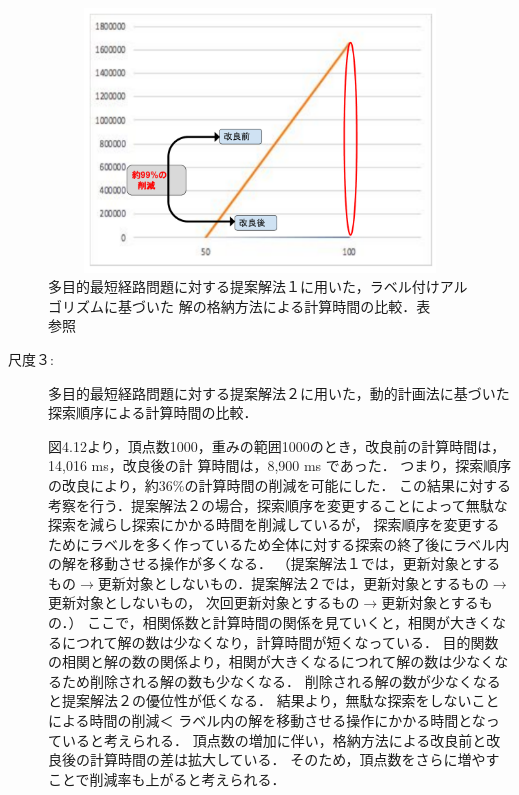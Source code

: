 \documentclass[12pt]{optlab-bachelor}
\begin{document}
\begin{figure}[htbp]
  \centering
  \includegraphics[height=7.0cm , width=15.0cm]{fig/fig14.pdf}
  \caption{多目的最短経路問題に対する提案解法１に用いた，ラベル付けアルゴリズムに基づいた
  解の格納方法による計算時間の比較．表　　参照}
\end{figure}


\begin{description}
  \item[尺度３:]
  多目的最短経路問題に対する提案解法２に用いた，動的計画法に基づいた探索順序による計算時間の比較．

  図4.12より，頂点数1000，重みの範囲1000のとき，改良前の計算時間は，14,016 ms，改良後の計 算時間は，8,900 ms であった．
  つまり，探索順序の改良により，約36\%の計算時間の削減を可能にした．
  この結果に対する考察を行う．提案解法２の場合，探索順序を変更することによって無駄な探索を減らし探索にかかる時間を削減しているが，
  探索順序を変更するためにラベルを多く作っているため全体に対する探索の終了後にラベル内の解を移動させる操作が多くなる．
  （提案解法１では，更新対象とするもの$\rightarrow$更新対象としないもの．提案解法２では，更新対象とするもの$\rightarrow$更新対象としないもの，
  次回更新対象とするもの$\rightarrow$更新対象とするもの．）
  ここで，相関係数と計算時間の関係を見ていくと，相関が大きくなるにつれて解の数は少なくなり，計算時間が短くなっている．
  目的関数の相関と解の数の関係より，相関が大きくなるにつれて解の数は少なくなるため削除される解の数も少なくなる．
  削除される解の数が少なくなると提案解法２の優位性が低くなる．
  結果より，無駄な探索をしないことによる時間の削減＜
  ラベル内の解を移動させる操作にかかる時間となっていると考えられる．
  頂点数の増加に伴い，格納方法による改良前と改良後の計算時間の差は拡大している．
  そのため，頂点数をさらに増やすことで削減率も上がると考えられる．

\end{description}
\end{document}
